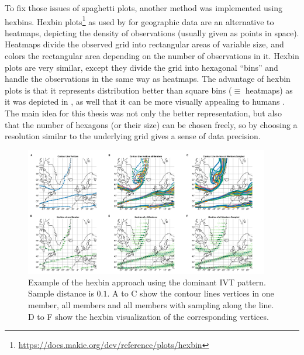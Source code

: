 To fix those issues of spaghetti plots, another method was implemented using hexbins. 
Hexbin plots\footnote{\url{https://docs.makie.org/dev/reference/plots/hexbin}} as used by  for geographic data are an alternative to heatmaps, depicting the density of observations (usually given as points in space). 
Heatmaps divide the observed grid into rectangular areas of variable size, and colors the rectangular area depending on the number of observations in it. 
Hexbin plots are very similar, except they divide the grid into hexagonal \enquote{bins} and handle the observations in the same way as heatmaps. 
The advantage of hexbin plots is that it represents distribution better than square bins ($\equiv$ heatmaps) as it was depicted in \cite{carr_hexagon_1992}, as well that it can be more visually appealing to humans \cite{carr_hexagon_1992}. 
The main idea for this thesis was not only the better representation, but also that the number of hexagons (or their size) can be chosen freely, so by choosing a resolution similar to the underlying grid gives a sense of data precision.

\begin{figure}
  \begin{center}
    \includegraphics[width=0.95\textwidth]{figures/hexbin_approach_overview.png}
  \end{center}
  \caption{Example of the hexbin approach using the dominant IVT pattern. Sample distance is $0.1$. A to C show the contour lines vertices in one member, all members and all members with sampling along the line. D to F show the hexbin visualization of the corresponding vertices.}\label{fig:hexbin overview}
\end{figure}


